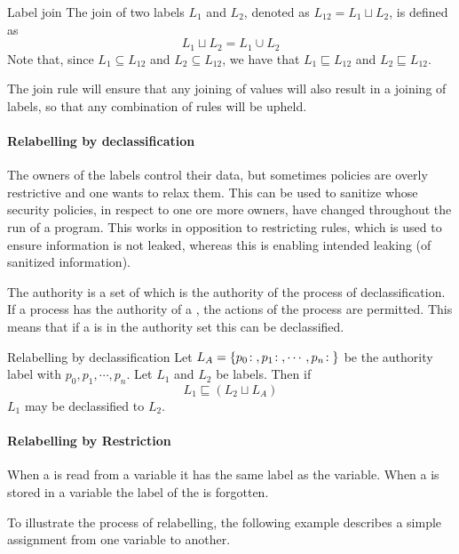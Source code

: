 \begin{definition}{Label join}
  The join of two labels $L_1$ and $L_2$, denoted as $L_{12} = L_1 \sqcup L_2$, is defined as
  $$L_1 \sqcup L_2 = L_1 \cup L_2$$
  Note that, since $L_1 \subseteq L_{12}$ and $L_2 \subseteq L_{12}$, we have that $L_1 \sqsubseteq L_{12}$ and $L_2 \sqsubseteq L_{12}$.
\end{definition}

The join rule will ensure that any joining of values will also result in a joining of labels, so that any combination of rules will be upheld.

\paragraph{Relabelling by declassification}
The owners of the labels control their data, but sometimes policies are overly restrictive and one wants to relax them.
This can be used to sanitize \xvalues{} whose security policies, in respect to one ore more owners, have changed throughout the run of a program.
This works in opposition to restricting rules, which is used to ensure information is not leaked, whereas this is enabling intended leaking (of sanitized information).

The authority is a set of \principals{} which is the authority of the process of declassification.
If a process has the authority of a \principal{}, the actions of the process are permitted.
This means that if a \principal{} is in the authority set this can be declassified.

\begin{definition}{Relabelling by declassification}
  Let $L_A = \{p_0\!:\;, p_1\!:\;, \cdots, p_n\!:\;\}$ be the authority label with \principals{} $p_0, p_1, \cdots, p_n$.
  Let $L_1$ and $L_2$ be labels.
  Then if $$L_1 \sqsubseteq (L_2 \sqcup L_A)$$
  $L_1$ may be declassified to $L_2$.
\end{definition}

\paragraph{Relabelling by Restriction}
When a \xvalue{} is read from a variable it has the same label as the variable.
When a \xvalue{} is stored in a variable the label of the \xvalue{} is forgotten.

To illustrate the process of relabelling, the following example describes a simple assignment from one variable to another.

